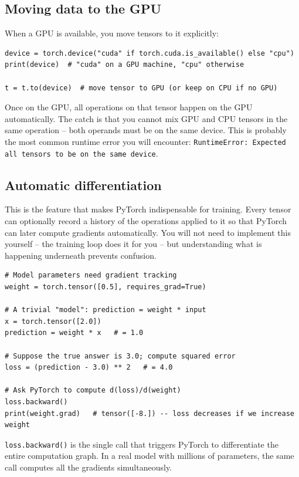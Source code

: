 \documentclass[11pt, a4paper]{article}
\begin{document}
\subsection{Moving data to the GPU}

When a GPU is available, you move tensors to it explicitly:

\begin{lstlisting}
device = torch.device("cuda" if torch.cuda.is_available() else "cpu")
print(device)  # "cuda" on a GPU machine, "cpu" otherwise

t = t.to(device)  # move tensor to GPU (or keep on CPU if no GPU)
\end{lstlisting}

Once on the GPU, all operations on that tensor happen on the GPU
automatically. The catch is that you cannot mix GPU and CPU tensors in the
same operation -- both operands must be on the same device. This is probably
the most common runtime error you will encounter:
\lstinline{RuntimeError: Expected all tensors to be on the same device}.

\subsection{Automatic differentiation}

This is the feature that makes PyTorch indispensable for training. Every
tensor can optionally record a history of the operations applied to it so that
PyTorch can later compute gradients automatically. You will not need to
implement this yourself -- the training loop does it for you -- but
understanding what is happening underneath prevents confusion.

\begin{lstlisting}
# Model parameters need gradient tracking
weight = torch.tensor([0.5], requires_grad=True)

# A trivial "model": prediction = weight * input
x = torch.tensor([2.0])
prediction = weight * x   # = 1.0

# Suppose the true answer is 3.0; compute squared error
loss = (prediction - 3.0) ** 2   # = 4.0

# Ask PyTorch to compute d(loss)/d(weight)
loss.backward()
print(weight.grad)   # tensor([-8.]) -- loss decreases if we increase weight
\end{lstlisting}

\lstinline{loss.backward()} is the single call that triggers PyTorch to
differentiate the entire computation graph. In a real model with millions of
parameters, the same call computes all the gradients simultaneously.
\end{document}
